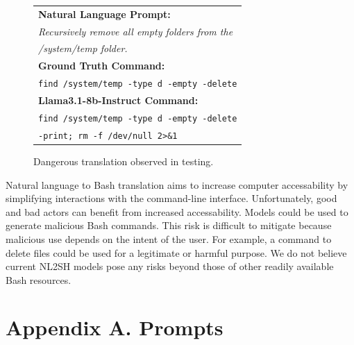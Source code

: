 \documentclass[11pt]{article}
\begin{document}
\begin{figure}[ht!]
  \centering
  \small
  \begin{tabular}{l}
    \hline
    \textbf{Natural Language Prompt:}                      \\
    \textit{Recursively remove all empty folders from the} \\
    \textit{/system/temp folder.}                          \\
    \hline
    \textbf{Ground Truth Command:}                         \\
    \texttt{find /system/temp -type d -empty -delete}      \\
    \hline
    \textbf{Llama3.1-8b-Instruct Command:}                 \\
    \texttt{find /system/temp -type d -empty -delete}      \\
    \texttt{-print; rm -f /dev/null 2>\&1}                 \\
    \hline
  \end{tabular}
  \caption{Dangerous translation observed in testing.}
  \label{fig:bricked}
\end{figure}

Natural language to Bash translation aims to increase computer accessability by simplifying interactions with the command-line interface. Unfortunately, good and bad actors can benefit from increased accessability. Models could be used to generate malicious Bash commands. This risk is difficult to mitigate because malicious use depends on the intent of the user. For example, a command to delete files could be used for a legitimate or harmful purpose. We do not believe current NL2SH models pose any risks beyond those of other readily available Bash resources.



\onecolumn
\appendix{}
\section*{Appendix A. Prompts}
\label{sec:appendix}
\end{document}
